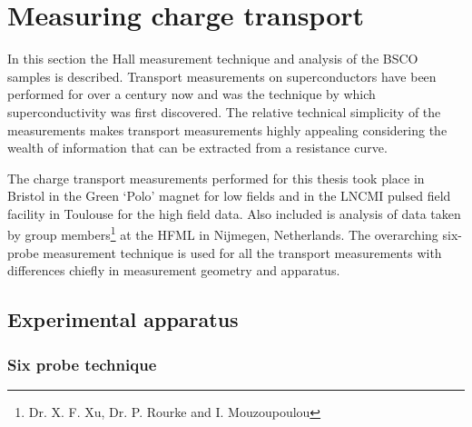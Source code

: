 
\section{Measuring charge transport}

In this section the Hall measurement technique and analysis of the \ac{BSCO} samples is described. Transport measurements on superconductors have been performed for over a century now and was the technique by which superconductivity was first discovered. The relative technical simplicity of the measurements makes transport measurements highly appealing considering the wealth of information that can be extracted from a resistance curve.

The charge transport measurements performed for this thesis took place in Bristol in the Green `Polo' magnet for low fields and in the \ac{LNCMI} pulsed field facility in Toulouse for the high field data. Also included is analysis of data taken by group members\footnote{Dr. X. F. Xu, Dr. P. Rourke and I. Mouzoupoulou} at the \ac{HFML} in Nijmegen, Netherlands. The overarching six-probe measurement technique is used for all the transport measurements with differences chiefly in measurement geometry and apparatus.

\subsection{Experimental apparatus}

\subsubsection{Six probe technique}

